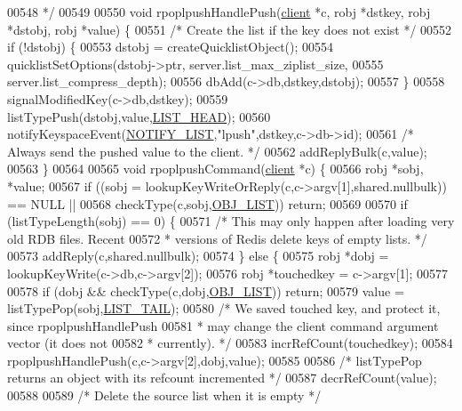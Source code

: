 \begin{DoxyCode}
00548 \textcolor{comment}{ */}
00549 
00550 \textcolor{keywordtype}{void} rpoplpushHandlePush(\hyperlink{structclient}{client} *c, robj *dstkey, robj *dstobj, robj *value) \{
00551     \textcolor{comment}{/* Create the list if the key does not exist */}
00552     \textcolor{keywordflow}{if} (!dstobj) \{
00553         dstobj = createQuicklistObject();
00554         quicklistSetOptions(dstobj->ptr, server.list\_max\_ziplist\_size,
00555                             server.list\_compress\_depth);
00556         dbAdd(c->db,dstkey,dstobj);
00557     \}
00558     signalModifiedKey(c->db,dstkey);
00559     listTypePush(dstobj,value,\hyperlink{server_8h_a5fc6a15ca26c6208f66ad2768a3108ef}{LIST\_HEAD});
00560     notifyKeyspaceEvent(\hyperlink{server_8h_a1c0b64c84b0e66dff3554ffe3e2ec4c8}{NOTIFY\_LIST},\textcolor{stringliteral}{"lpush"},dstkey,c->db->id);
00561     \textcolor{comment}{/* Always send the pushed value to the client. */}
00562     addReplyBulk(c,value);
00563 \}
00564 
00565 \textcolor{keywordtype}{void} rpoplpushCommand(\hyperlink{structclient}{client} *c) \{
00566     robj *sobj, *value;
00567     \textcolor{keywordflow}{if} ((sobj = lookupKeyWriteOrReply(c,c->argv[1],shared.nullbulk)) == NULL ||
00568         checkType(c,sobj,\hyperlink{server_8h_a4a5f22a280949c97a0cb0d4213275126}{OBJ\_LIST})) \textcolor{keywordflow}{return};
00569 
00570     \textcolor{keywordflow}{if} (listTypeLength(sobj) == 0) \{
00571         \textcolor{comment}{/* This may only happen after loading very old RDB files. Recent}
00572 \textcolor{comment}{         * versions of Redis delete keys of empty lists. */}
00573         addReply(c,shared.nullbulk);
00574     \} \textcolor{keywordflow}{else} \{
00575         robj *dobj = lookupKeyWrite(c->db,c->argv[2]);
00576         robj *touchedkey = c->argv[1];
00577 
00578         \textcolor{keywordflow}{if} (dobj && checkType(c,dobj,\hyperlink{server_8h_a4a5f22a280949c97a0cb0d4213275126}{OBJ\_LIST})) \textcolor{keywordflow}{return};
00579         value = listTypePop(sobj,\hyperlink{server_8h_a745de98bef5b645df56479181803235b}{LIST\_TAIL});
00580         \textcolor{comment}{/* We saved touched key, and protect it, since rpoplpushHandlePush}
00581 \textcolor{comment}{         * may change the client command argument vector (it does not}
00582 \textcolor{comment}{         * currently). */}
00583         incrRefCount(touchedkey);
00584         rpoplpushHandlePush(c,c->argv[2],dobj,value);
00585 
00586         \textcolor{comment}{/* listTypePop returns an object with its refcount incremented */}
00587         decrRefCount(value);
00588 
00589         \textcolor{comment}{/* Delete the source list when it is empty */}

\end{DoxyCode}
